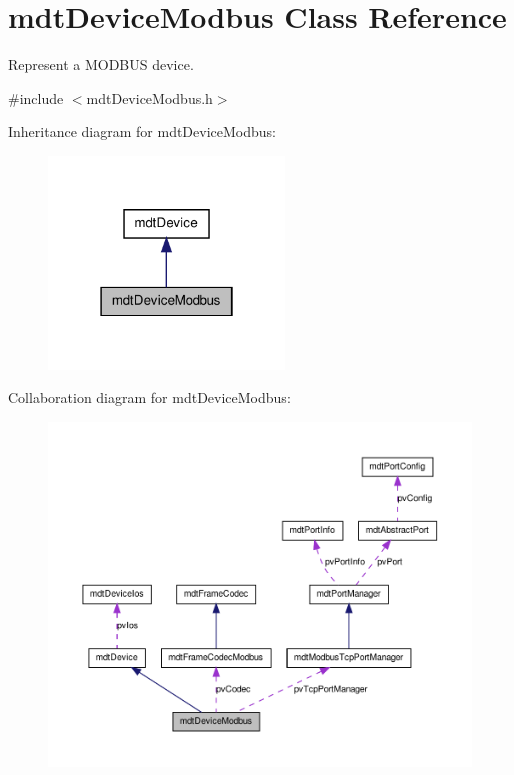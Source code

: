 \hypertarget{classmdt_device_modbus}{
\section{mdtDeviceModbus Class Reference}
\label{classmdt_device_modbus}
}


Represent a MODBUS device.  




{\ttfamily \#include $<$mdtDeviceModbus.h$>$}



Inheritance diagram for mdtDeviceModbus:
\nopagebreak
\begin{figure}[H]
\begin{center}
\leavevmode
\includegraphics[width=178pt]{classmdt_device_modbus__inherit__graph}
\end{center}
\end{figure}


Collaboration diagram for mdtDeviceModbus:
\nopagebreak
\begin{figure}[H]
\begin{center}
\leavevmode
\includegraphics[width=400pt]{classmdt_device_modbus__coll__graph}
\end{center}
\end{figure}
